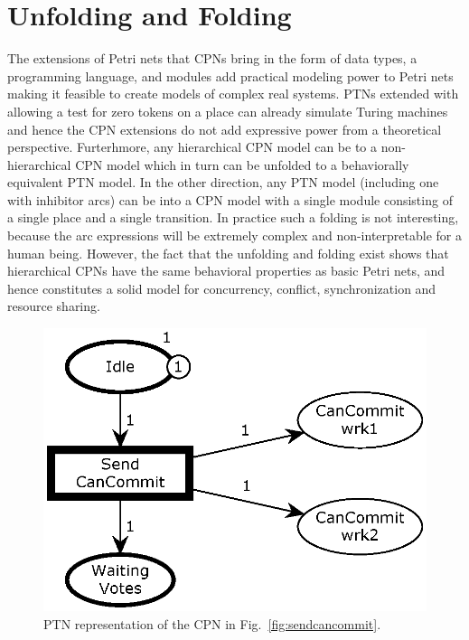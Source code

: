 \section{Unfolding and Folding}
\label{sect:unfolding}

The extensions of Petri nets that CPNs bring in the form of data
types, a programming language, and modules add practical modeling
power to Petri nets making it feasible to create models of complex
real systems. PTNs extended with  allowing a
test for zero tokens on a place can already simulate Turing machines
and hence the CPN extensions do not add expressive power from a
theoretical perspective. Furterhmore, any hierarchical CPN model can
be  to a non-hierarchical CPN model which in turn
can be unfolded to a behaviorally equivalent PTN model. In the other
direction, any PTN model (including one with inhibitor arcs) can be
 into a CPN model with a single module consisting of a
single place and a single transition. In practice such a folding is
not interesting, because the arc expressions will be extremely complex
and non-interpretable for a human being. However, the fact that the
unfolding and folding exist shows that hierarchical CPNs have the same
behavioral properties as basic Petri nets, and hence constitutes a
solid model for concurrency, conflict, synchronization and resource
sharing.




\begin{figure}[]
\centering
\includegraphics[scale=.43]{figures/PTSendCanCommit.eps}
\caption{PTN representation of the CPN in Fig.~\ref{fig:sendcancommit}.}
\label{fig:sendcancommitunfold}
\end{figure}

